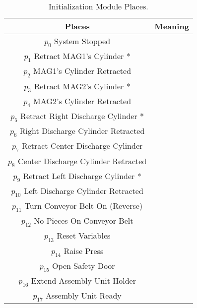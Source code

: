 \begin{table}[htbp]
\caption{Initialization Module Places.}
\centering
\begin{tabular}{cc}
Places & Meaning\\
\hline
\hyperlink{partialNet:p0}{\hypertarget{partialTable:p0m1}{$p_{0}$}} System Stopped\\
\hyperlink{partialNet:p1}{\hypertarget{partialTable:p1}{$p_{1}$}} Retract MAG1's Cylinder *\\
\hyperlink{partialNet:p2}{\hypertarget{partialTable:p2}{$p_{2}$}} MAG1's Cylinder Retracted\\
\hyperlink{partialNet:p3}{\hypertarget{partialTable:p3}{$p_{3}$}} Retract MAG2's Cylinder *\\
\hyperlink{partialNet:p4}{\hypertarget{partialTable:p4}{$p_{4}$}} MAG2's Cylinder Retracted\\
\hyperlink{partialNet:p5}{\hypertarget{partialTable:p5}{$p_{5}$}} Retract Right Discharge Cylinder *\\
\hyperlink{partialNet:p6}{\hypertarget{partialTable:p6}{$p_{6}$}} Right Discharge Cylinder Retracted\\
\hyperlink{partialNet:p7}{\hypertarget{partialTable:p7}{$p_{7}$}} Retract Center Discharge Cylinder\\
\hyperlink{partialNet:p8}{\hypertarget{partialTable:p8}{$p_{8}$}} Center Discharge Cylinder Retracted\\
\hyperlink{partialNet:p9}{\hypertarget{partialTable:p9}{$p_{9}$}} Retract Left Discharge Cylinder *\\
\hyperlink{partialNet:p10}{\hypertarget{partialTable:p10}{$p_{10}$}} Left Discharge Cylinder Retracted\\
\hyperlink{partialNet:p11}{\hypertarget{partialTable:p11}{$p_{11}$}} Turn Conveyor Belt On (Reverse)\\
\hyperlink{partialNet:p12}{\hypertarget{partialTable:p12}{$p_{12}$}} No Pieces On Conveyor Belt\\
\hyperlink{partialNet:p13}{\hypertarget{partialTable:p13}{$p_{13}$}} Reset Variables\\
\hyperlink{partialNet:p14}{\hypertarget{partialTable:p14}{$p_{14}$}} Raise Press\\
\hyperlink{partialNet:p15}{\hypertarget{partialTable:p15}{$p_{15}$}} Open Safety Door\\
\hyperlink{partialNet:p16}{\hypertarget{partialTable:p16}{$p_{16}$}} Extend Assembly Unit Holder\\
\hyperlink{partialNet:p17}{\hypertarget{partialTable:p17}{$p_{17}$}} Assembly Unit Ready\\

\end{tabular}
\end{table}
